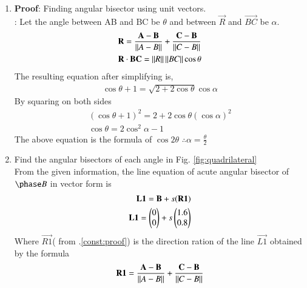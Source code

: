 \begin{enumerate}[label=\arabic*.,ref=\thesubsection.\theenumi]
\item \textbf{Proof}: Finding angular bisector using unit vectors.
\label{const:proof}
\\
\solution: Let the angle between AB and BC be $\theta$ and between $\vec{R}$ and $\vec{BC}$ be $\alpha$.
\begin{align}
\mathbf{R}=\frac{\mathbf{A}-\mathbf{B}}{\left\lVert A-B\right\rVert}+\frac{\mathbf{C}-\mathbf{B}}{\left\lVert C-B\right\rVert}
\\
\mathbf{R}\cdot\mathbf{BC} = \left\lVert R\right\rVert \left\lVert BC\right\rVert \cos\theta
\end{align} 
The resulting equation after simplifying is,
\begin{align}
\cos \theta + 1=\sqrt{2+2\cos\theta}\cos\alpha
\end{align}
By squaring on both sides
\begin{align}
(\cos \theta +1)^2=2+2\cos\theta(\cos\alpha)^2
\\
\cos\theta=2\cos^2\alpha-1
\end{align}
The above equation is the formula of $\cos 2\theta$
$\therefore \alpha=\frac{\theta}{2}$
%
\item Find the angular bisectors of each angle in Fig. \ref{fig:quadrilateral}
\label{const:quadrilateral}
\\
%
\solution 
From the given information, the line equation of acute angular bisector of $\phase B$ in vector form is 
\begin{align}
\label{eq:constr_a}
\mathbf{L1} =  \mathbf{B}+s(\mathbf{R1})
\\
\mathbf{L1} = \begin{pmatrix}0\\0\end{pmatrix}+s\begin{pmatrix}1.6\\0.8\end{pmatrix}
\end{align}
Where $\vec{R1}$( from .\eqref{const:proof}) is the direction ration of the line $\vec{L1}$ obtained by the formula
\\
$$\mathbf{R1}=\frac{\mathbf{A}-\mathbf{B}}{\left\lVert A-B\right\rVert}+\frac{\mathbf{C}-\mathbf{B}}{\left\lVert C-B\right\rVert}$$

\end{enumerate}
